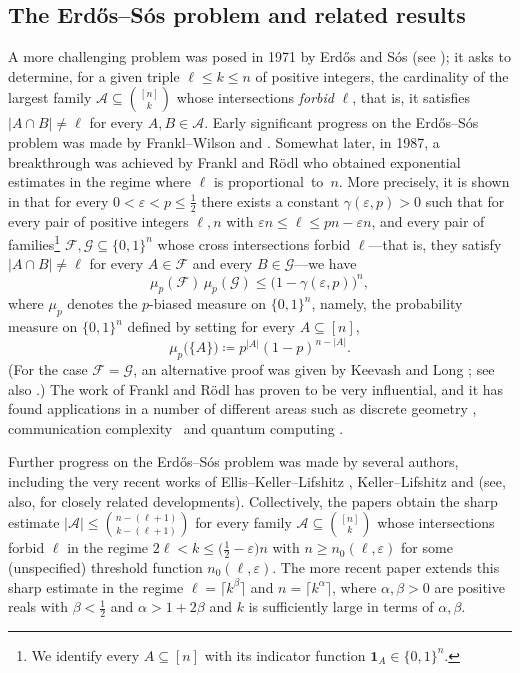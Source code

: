 \documentclass[10pt]{amsart}
\theoremstyle{remark}
\newcommand{\ee}{\varepsilon}
\newcommand{\meg}{\geqslant}
\newcommand{\mik}{\leqslant}
\newcommand{\Fcal}{\mathcal{F}}
\newcommand{\Gcal}{\mathcal{G}}
\begin{document}
\subsection{The Erd\H{o}s--S\'{o}s problem and related results} \label{subsec1.1}

A more challenging problem was posed in 1971 by Erd\H{o}s and S\'{o}s (see \cite{Erd75}); it asks to determine,
for a given triple $\ell\mik k\mik n$ of positive integers, the cardinality of the largest family
$\mathcal{A}\subseteq \binom{[n]}{k}$ whose intersections \textit{forbid} $\ell$, that is, it satisfies
$|A\cap B|\neq \ell$ for every $A,B\in\mathcal{A}$. Early significant progress on the Erd\H{o}s--S\'{o}s problem
was made by Frankl--Wilson \cite{FW81} and  \cite{FF85}. Somewhat later, in 1987,
a breakthrough was achieved by Frankl and R\"{o}dl who obtained exponential estimates in the regime where
$\ell$ is proportional~to~$n$. More precisely, it is shown in \cite[Theorem 1.5]{FR87} that for
every $0<\ee<p\mik \frac12$ there exists a constant $\gamma(\ee,p)>0$ such that for every pair of
positive integers $\ell,n$ with $\ee n\mik \ell\mik pn-\ee n$, and every pair of families\footnote{We
identify every $A\subseteq [n]$ with its indicator function $\mathbf{1}_A\in \{0,1\}^n$.}
$\Fcal,\Gcal\subseteq \{0,1\}^n$ whose cross intersections forbid $\ell$---that is, they satisfy
$|A\cap B|\neq \ell$ for every $A\in\Fcal$ and every $B\in\Gcal$---we have
\begin{equation} \label{e1.1}
\mu_p(\Fcal)\, \mu_p(\Gcal) \mik \big(1-\gamma(\ee,p)\big)^n,
\end{equation}
where $\mu_p$ denotes the $p$-biased measure on $\{0,1\}^n$, namely, the probability measure
on $\{0,1\}^n$ defined by setting for every $A\subseteq [n]$,
\begin{equation} \label{e1.2}
\mu_p\big(\{A\}\big) \coloneqq p^{|A|} (1-p)^{n-|A|}.
\end{equation}
(For the case $\Fcal=\Gcal$, an alternative proof was given by Keevash and Long \cite{KLo16}; see also \cite{KSZ22}.)
The work of Frankl and R\"{o}dl has proven to be very influential, and it has found applications
in a number of different areas such as discrete geometry \cite{FR90},
communication complexity~\cite{S99} and quantum computing \cite{BCW99}.

Further progress on the Erd\H{o}s--S\'{o}s problem was made by several authors, including the very recent
works of Ellis--Keller--Lifshitz \cite{EKL24}, Keller--Lifshitz \cite{KLi21} and  \cite{KZ24}
(see, also, \cite{KLLM23,KLo20} for closely related developments). Collectively, the papers \cite{EKL24,KLi21}
obtain the sharp estimate $|\mathcal{A}|\mik \binom{n-(\ell+1)}{k-(\ell+1)}$ for every family
$\mathcal{A}\subseteq \binom{[n]}{k}$ whose intersections forbid $\ell$ in the regime
$2\ell< k\mik \big(\frac12-\ee\big)n$ with $n\meg n_0(\ell,\ee)$ for some (unspecified)
threshold function $n_0(\ell,\ee)$. The more recent paper \cite{KZ24} extends this sharp estimate in the regime
$\ell=\lceil k^\beta\rceil$ and $n=\lceil k^\alpha\rceil$, where $\alpha,\beta>0$ are positive reals
with $\beta<\frac12$ and $\alpha>1+2\beta$ and $k$ is sufficiently large in terms of $\alpha,\beta$.
\end{document}
